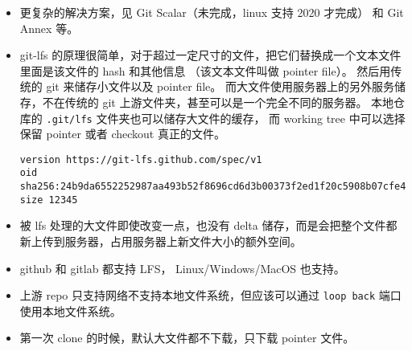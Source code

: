 
\begin{issues}
\issueDraft
\end{issues}

\begin{itemize}
\item 更复杂的解决方案，见 Git Scalar（未完成，linux 支持 2020 才完成） 和 Git Annex 等。
\item git-lfs 的原理很简单，对于超过一定尺寸的文件，把它们替换成一个文本文件里面是该文件的 hash 和其他信息 （该文本文件叫做 pointer file）。 然后用传统的 git 来储存小文件以及 pointer file。 而大文件使用服务器上的另外服务储存，不在传统的 git 上游文件夹，甚至可以是一个完全不同的服务器。 本地仓库的 \verb`.git/lfs` 文件夹也可以储存大文件的缓存， 而 working tree 中可以选择保留 pointer 或者 checkout 真正的文件。
\begin{lstlisting}[language=none,caption=example\_pointer\_file]
version https://git-lfs.github.com/spec/v1
oid sha256:24b9da6552252987aa493b52f8696cd6d3b00373f2ed1f20c5908b07cfe4f2c0
size 12345
\end{lstlisting}
\item 被 lfs 处理的大文件即使改变一点，也没有 delta 储存，而是会把整个文件都新上传到服务器，占用服务器上新文件大小的额外空间。
\item github 和 gitlab 都支持 LFS， Linux/Windows/MacOS 也支持。
\item 上游 repo 只支持网络不支持本地文件系统，但应该可以通过 \verb`loop back` 端口使用本地文件系统。
\item 第一次 clone 的时候，默认大文件都不下载，只下载 pointer 文件。
\end{itemize}

